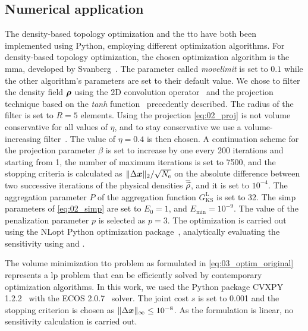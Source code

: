 \subsection{Numerical application} \label{sec:03_applications}
The density-based topology optimization and the \gls{tto} have both been implemented using Python, employing different optimization algorithms. For density-based topology optimization, the chosen optimization algorithm is the \gls{mma}, developed by Svanberg~. The parameter called \textit{movelimit} is set to $0.1$ while the other algorithm's parameters are set to their default value. We chose to filter the density field $\bm{\rho}$ using the 2D convolution operator~ and the projection technique based on the \textit{tanh} function~ precedently described. The radius of the filter is set to $R=5$ elements.  Using the projection \eqref{eq:02_proj} is not volume conservative for all values of $\eta$, and to stay conservative we use a volume-increasing filter~. The value of $\eta = 0.4$ is then chosen. A continuation scheme for the projection parameter $\beta$ is set to increase by one every 200 iterations and starting from 1, the number of maximum iterations is set to 7500, and the stopping criteria is calculated as $\Vert \Delta \bm{x} \Vert_2 / \sqrt{N_\text{e}}$ \cite{ferrari_new_2020} on the absolute difference between two successive iterations of the physical densities $\overline{\widetilde{\rho}}$, and it is set to $10^{-4}$. The aggregation parameter $P$ of the aggregation function $G_{\text{KS}}^\text{L}$ is set to 32. The \gls{simp} parameters of \eqref{eq:02_simp} are set to $E_0 = 1$, and $E_{\textrm{min}} = 10^{-9}$. The value of the penalization parameter $p$ is selected as $p=3$. The optimization is carried out using the NLopt Python optimization package~, analytically evaluating the sensitivity using  and .

The volume minimization \gls{tto} problem as formulated in \ref{eq:03_optim_original} represents a \gls{lp} problem that can be efficiently solved by contemporary optimization algorithms. In this work, we used the Python package CVXPY 1.2.2~ with the ECOS 2.0.7~ solver. The joint cost $s$ is set to 0.001 and the stopping criterion is chosen as $\lVert\Delta \bm{x}\rVert_\infty \leq 10^{-8}$. As the formulation is linear, no sensitivity calculation is carried out.

